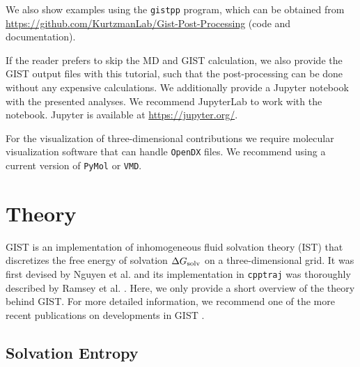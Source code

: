 \documentclass[9pt,tutorial]{livecoms}
\newcommand{\dgsolv}{\Delta G_\textup{solv}}
\newcommand{\software}{\texttt}
\begin{document}
We also show examples using the \software{gistpp} program, which can be obtained from \url{https://github.com/KurtzmanLab/Gist-Post-Processing} (code and documentation).

If the reader prefers to skip the MD and GIST calculation, we also provide the GIST output files with this tutorial, such that the post-processing can be done without any expensive calculations.
We additionally provide a Jupyter notebook \cite{Kluyver2016-jupyter,Granger2021-jupyter} with the presented analyses. 
We recommend JupyterLab to work with the notebook. Jupyter is available at \url{https://jupyter.org/}.

For the visualization of three-dimensional contributions we require molecular visualization software that can handle \software{OpenDX} files.
We recommend using a current version of \software{PyMol}\cite{pymol} or \software{VMD}\cite{vmd}.
\section{Theory}

GIST is an implementation of inhomogeneous fluid solvation theory (IST) \cite{Lazaridis1998} that discretizes the free energy of solvation $\dgsolv$ on a three-dimensional grid. 
It was first devised by Nguyen et al. \cite{Nguyen2012} and its implementation in \software{cpptraj} was thoroughly described by Ramsey et al. \cite{Ramsey2016}. %
Here, we only provide a short overview of the theory behind GIST.
For more detailed information, we recommend one of the more recent publications on developments in GIST \cite{Kraml2020,Chen2021}.

\subsection{Solvation Entropy}

\end{document}
